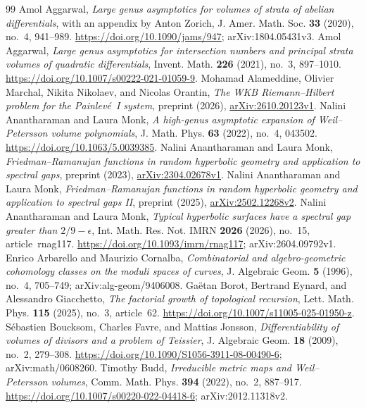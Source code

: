\begin{thebibliography}{99}
 Amol Aggarwal, \emph{Large genus asymptotics for volumes of strata of abelian differentials}, with an appendix by Anton Zorich, J. Amer. Math. Soc. \textbf{33} (2020), no.~4, 941--989. \url{https://doi.org/10.1090/jams/947}; arXiv:1804.05431v3.
 Amol Aggarwal, \emph{Large genus asymptotics for intersection numbers and principal strata volumes of quadratic differentials}, Invent. Math. \textbf{226} (2021), no.~3, 897--1010. \url{https://doi.org/10.1007/s00222-021-01059-9}.
 Mohamad Alameddine, Olivier Marchal, Nikita Nikolaev, and Nicolas Orantin, \emph{The WKB Riemann--Hilbert problem for the Painlev\'e~I system}, preprint (2026), \href{https://arxiv.org/abs/2610.20123v1}{arXiv:2610.20123v1}.
 Nalini Anantharaman and Laura Monk, \emph{A high-genus asymptotic expansion of Weil--Petersson volume polynomials}, J. Math. Phys. \textbf{63} (2022), no.~4, 043502. \url{https://doi.org/10.1063/5.0039385}.
 Nalini Anantharaman and Laura Monk, \emph{Friedman--Ramanujan functions in random hyperbolic geometry and application to spectral gaps}, preprint (2023), \href{https://arxiv.org/abs/2304.02678v1}{arXiv:2304.02678v1}.
 Nalini Anantharaman and Laura Monk, \emph{Friedman--Ramanujan functions in random hyperbolic geometry and application to spectral gaps II}, preprint (2025), \href{https://arxiv.org/abs/2502.12268v2}{arXiv:2502.12268v2}.
 Nalini Anantharaman and Laura Monk, \emph{Typical hyperbolic surfaces have a spectral gap greater than $2/9-\epsilon$}, Int. Math. Res. Not. IMRN \textbf{2026} (2026), no.~15, article~rnag117. \url{https://doi.org/10.1093/imrn/rnag117}; arXiv:2604.09792v1.
 Enrico Arbarello and Maurizio Cornalba, \emph{Combinatorial and algebro-geometric cohomology classes on the moduli spaces of curves}, J. Algebraic Geom. \textbf{5} (1996), no.~4, 705--749; arXiv:alg-geom/9406008.
 Ga\"etan Borot, Bertrand Eynard, and Alessandro Giacchetto, \emph{The factorial growth of topological recursion}, Lett. Math. Phys. \textbf{115} (2025), no.~3, article~62. \url{https://doi.org/10.1007/s11005-025-01950-z}.
 S\'ebastien Boucksom, Charles Favre, and Mattias Jonsson, \emph{Differentiability of volumes of divisors and a problem of Teissier}, J. Algebraic Geom. \textbf{18} (2009), no.~2, 279--308. \url{https://doi.org/10.1090/S1056-3911-08-00490-6}; arXiv:math/0608260.
 Timothy Budd, \emph{Irreducible metric maps and Weil--Petersson volumes}, Comm. Math. Phys. \textbf{394} (2022), no.~2, 887--917. \url{https://doi.org/10.1007/s00220-022-04418-6}; arXiv:2012.11318v2.

\end{thebibliography}
